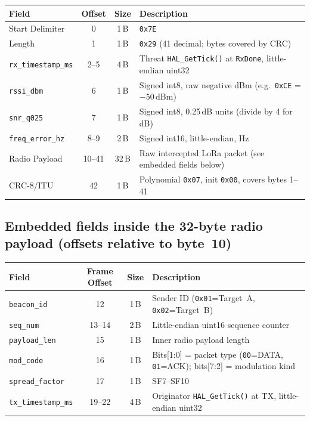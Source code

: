 \documentclass[11pt,letterpaper]{article}
\begin{document}
\begin{table}[h!]
	\centering
	\renewcommand{\arraystretch}{1.3}
	\begin{tabularx}{\textwidth}{l c c X}
		\toprule
		\textbf{Field} & \textbf{Offset} & \textbf{Size} & \textbf{Description} \\
		\midrule
		Start Delimiter & 0 & 1\,B & \texttt{0x7E} \\
		Length & 1 & 1\,B & \texttt{0x29} (41 decimal; bytes covered by \mbox{CRC}) \\
		\texttt{rx\_timestamp\_ms} & 2--5 & 4\,B & Threat \texttt{HAL\_GetTick()} at \texttt{RxDone}, little-endian uint32 \\
		\texttt{rssi\_dbm} & 6 & 1\,B & Signed int8, raw negative dBm (e.g.\ \texttt{0xCE} = $-50$\,dBm) \\
		\texttt{snr\_q025} & 7 & 1\,B & Signed int8, 0.25\,dB units (divide by 4 for dB) \\
		\texttt{freq\_error\_hz} & 8--9 & 2\,B & Signed int16, little-endian, Hz \\
		Radio Payload & 10--41 & 32\,B & Raw intercepted LoRa packet (see embedded fields below) \\
		\mbox{CRC}-8/ITU & 42 & 1\,B & Polynomial \texttt{0x07}, init \texttt{0x00}, covers bytes 1--41 \\
		\bottomrule
	\end{tabularx}
\end{table}

\subsection*{Embedded fields inside the 32-byte radio payload (offsets relative to byte~10)}
\begin{table}[h!]
	\centering
	\renewcommand{\arraystretch}{1.3}
	\begin{tabularx}{\textwidth}{l c c X}
		\toprule
		\textbf{Field} & \textbf{Frame Offset} & \textbf{Size} & \textbf{Description} \\
		\midrule
		\texttt{beacon\_id}        & 12     & 1\,B & Sender \mbox{ID} (\texttt{0x01}=Target~A, \texttt{0x02}=Target~B) \\
		\texttt{seq\_num}          & 13--14 & 2\,B & Little-endian uint16 sequence counter \\
		\texttt{payload\_len}      & 15     & 1\,B & Inner radio payload length \\
		\texttt{mod\_code}         & 16     & 1\,B & Bits[1:0] = packet type (\texttt{00}=DATA, \texttt{01}=ACK); bits[7:2] = modulation kind \\
		\texttt{spread\_factor}    & 17     & 1\,B & SF7--SF10 \\
		\texttt{tx\_timestamp\_ms} & 19--22 & 4\,B & Originator \texttt{HAL\_GetTick()} at \mbox{TX}, little-endian uint32 \\
		\bottomrule
	\end{tabularx}
\end{table}
\end{document}
